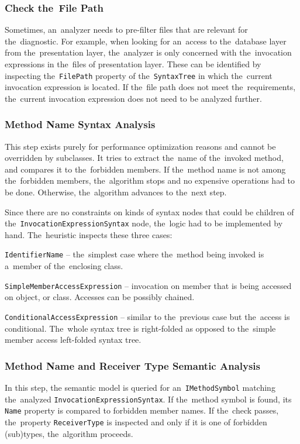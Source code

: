 \documentclass[
  digital, %
  table,   %
  lof,     %
  lot,     %
  oneside,
]{fithesis3}
\begin{document}
\subsubsection{\textbf{Check the~File Path}}
Sometimes, an~analyzer needs to pre-filter files that are relevant for the~diagnostic. For example, when looking for an~access to the~database layer from the~presentation layer, the~analyzer is only concerned with the~invocation expressions in the~files of presentation layer. These can be identified by inspecting the~\texttt{FilePath} property of the~\texttt{SyntaxTree} in which the~current invocation expression is located. If the~file path does not meet the~requirements, the~current invocation expression does not need to be analyzed further.

\subsubsection{\textbf{Method Name Syntax Analysis}}
This step exists purely for performance optimization reasons and cannot be overridden by subclasses. It tries to extract the~name of the~invoked method, and compares it to the~forbidden members. If the~method name is not among the~forbidden members, the~algorithm stops and no expensive operations had to be done. Otherwise, the~algorithm advances to the~next step.

Since there are no constraints on kinds of syntax nodes that could be children of the~\texttt{InvocationExpressionSyntax} node, the~logic had to be implemented by hand. The~heuristic inspects these three cases:
\begin{compactitem}
  \item[\texttt{IdentifierName}] -- the~simplest case where the~method being invoked is a~member of the~enclosing class.
    
  \item[\texttt{SimpleMemberAccessExpression}] -- invocation on member that is being accessed on object, or class. Accesses can be possibly chained.    

  \item[\texttt{ConditionalAccessExpression}] -- similar to the~previous case but the~access is conditional. The~whole syntax tree is right-folded as opposed to the~simple member access left-folded syntax tree. 
\end{compactitem}

\subsubsection{\textbf{Method Name and Receiver Type Semantic Analysis}}
In this step, the semantic model is queried for an~\texttt{IMethodSymbol} matching the~analyzed \texttt{InvocationExpressionSyntax}. If the~method symbol is found, its \texttt{Name} property is compared to forbidden member names. If the~check passes, the~property \texttt{ReceiverType} is inspected and only if it is one of forbidden (sub)types, the~algorithm proceeds. 
\end{document}
